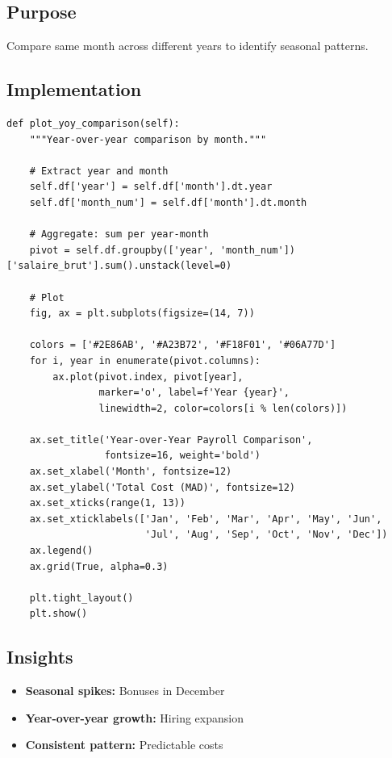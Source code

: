 \subsection{Purpose}
Compare same month across different years to identify seasonal patterns.

\subsection{Implementation}

\begin{lstlisting}[style=pythonstyle]
def plot_yoy_comparison(self):
    """Year-over-year comparison by month."""
    
    # Extract year and month
    self.df['year'] = self.df['month'].dt.year
    self.df['month_num'] = self.df['month'].dt.month
    
    # Aggregate: sum per year-month
    pivot = self.df.groupby(['year', 'month_num'])['salaire_brut'].sum().unstack(level=0)
    
    # Plot
    fig, ax = plt.subplots(figsize=(14, 7))
    
    colors = ['#2E86AB', '#A23B72', '#F18F01', '#06A77D']
    for i, year in enumerate(pivot.columns):
        ax.plot(pivot.index, pivot[year],
                marker='o', label=f'Year {year}',
                linewidth=2, color=colors[i % len(colors)])
    
    ax.set_title('Year-over-Year Payroll Comparison',
                 fontsize=16, weight='bold')
    ax.set_xlabel('Month', fontsize=12)
    ax.set_ylabel('Total Cost (MAD)', fontsize=12)
    ax.set_xticks(range(1, 13))
    ax.set_xticklabels(['Jan', 'Feb', 'Mar', 'Apr', 'May', 'Jun',
                        'Jul', 'Aug', 'Sep', 'Oct', 'Nov', 'Dec'])
    ax.legend()
    ax.grid(True, alpha=0.3)
    
    plt.tight_layout()
    plt.show()
\end{lstlisting}

\subsection{Insights}

\begin{itemize}
    \item \textbf{Seasonal spikes:} Bonuses in December
    \item \textbf{Year-over-year growth:} Hiring expansion
    \item \textbf{Consistent pattern:} Predictable costs
\end{itemize}
